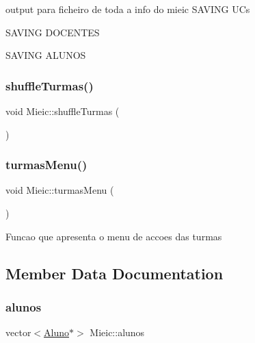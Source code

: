 output para ficheiro de toda a info do mieic S\+A\+V\+I\+NG UC\textquotesingle{}s

S\+A\+V\+I\+NG D\+O\+C\+E\+N\+T\+ES

S\+A\+V\+I\+NG A\+L\+U\+N\+OS \hypertarget{class_mieic_a67e9f290c1945a0ee0bfed87f30329a8}{}\label{class_mieic_a67e9f290c1945a0ee0bfed87f30329a8} 
\subsubsection{\texorpdfstring{shuffle\+Turmas()}{shuffleTurmas()}}
{\footnotesize\ttfamily void Mieic\+::shuffle\+Turmas (\begin{DoxyParamCaption}{ }\end{DoxyParamCaption})}

\hypertarget{class_mieic_a83e1a70ed09ad32ad02acea39186365f}{}\label{class_mieic_a83e1a70ed09ad32ad02acea39186365f} 
\subsubsection{\texorpdfstring{turmas\+Menu()}{turmasMenu()}}
{\footnotesize\ttfamily void Mieic\+::turmas\+Menu (\begin{DoxyParamCaption}{ }\end{DoxyParamCaption})}

Funcao que apresenta o menu de accoes das turmas 

\subsection{Member Data Documentation}
\hypertarget{class_mieic_a3840d1d5343ac6ac8b42e698e6cfde3e}{}\label{class_mieic_a3840d1d5343ac6ac8b42e698e6cfde3e} 
\subsubsection{\texorpdfstring{alunos}{alunos}}
{\footnotesize\ttfamily vector$<$\hyperlink{class_aluno}{Aluno}$\ast$$>$ Mieic\+::alunos\hspace{0.3cm}{\ttfamily [private]}}

\hypertarget{class_mieic_adffe68e30feb27ccb73a39cfee4fbb78}{}\label{class_mieic_adffe68e30feb27ccb73a39cfee4fbb78} 
